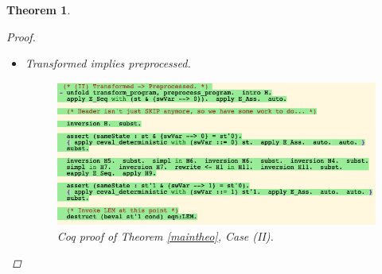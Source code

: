 \documentclass[12pt,notitlepage]{report}
\theoremstyle{plain}
\newtheorem{theo}{Theorem}[section]
\theoremstyle{definition}
\numberwithin{equation}{section}
\begin{document}
\begin{theo}
\begin{proof}
\begin{itemize}
\begin{itemize}
                The proof of this part is similar to Case (I.i), except that now the new hypothesis from \verb$destruct$ is instead
                \begin{verbatim}
LEM : beval st'1 cond = false\end{verbatim}
and so we proceed through the correspondingly different path of the while-switch construct.
            \end{itemize}
        \item[(II)] Transformed implies preprocessed.
        
            \noindent\begin{figure}[H]
        \centering
        \includegraphics[scale=0.6]{alltrans_2}
        \caption{Coq proof of Theorem \ref{maintheo}, Case (II).}
        \label{fig:maintheo2}
        \end{figure}
            

\end{itemize}
\end{proof}
\end{theo}
\end{document}
